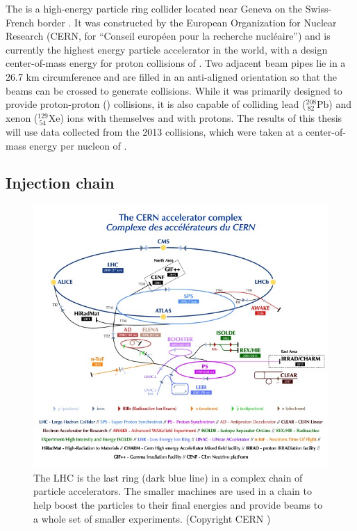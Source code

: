 The \lhc is a high-energy particle ring collider located near Geneva on the Swiss-French border \cite{LHCMachine}.
It was constructed by the European Organization for Nuclear Research (CERN, for ``Conseil européen pour la recherche nucléaire'') and is currently the highest energy particle accelerator in the world, with a design center-of-mass energy for proton collisions of \ppenergy.
Two adjacent beam pipes lie in a 26.7 km circumference and are filled in an anti-aligned orientation so that the beams can be crossed to generate collisions.
While it was primarily designed to provide proton-proton (\pp) collisions, it is also capable of colliding lead (${}^{208}_{\ 82}\textrm{Pb}$) and xenon (${}^{129}_{\ 54}\textrm{Xe}$) ions with themselves and with protons.
The results of this thesis will use data collected from the 2013 \pPb collisions, which were taken at a center-of-mass energy per nucleon of \pPbenergy.

\subsection{Injection chain}

\begin{figure}[t]
\includegraphics{CCC-v2018-print-v2.jpg}
\caption{The LHC is the last ring (dark blue line) in a complex chain of particle accelerators. The smaller machines are used in a chain to help boost the particles to their final energies and provide beams to a whole set of smaller experiments. (Copyright CERN \cite{Mobs:2636343})}
\label{fig:injection_chain}
\end{figure}

